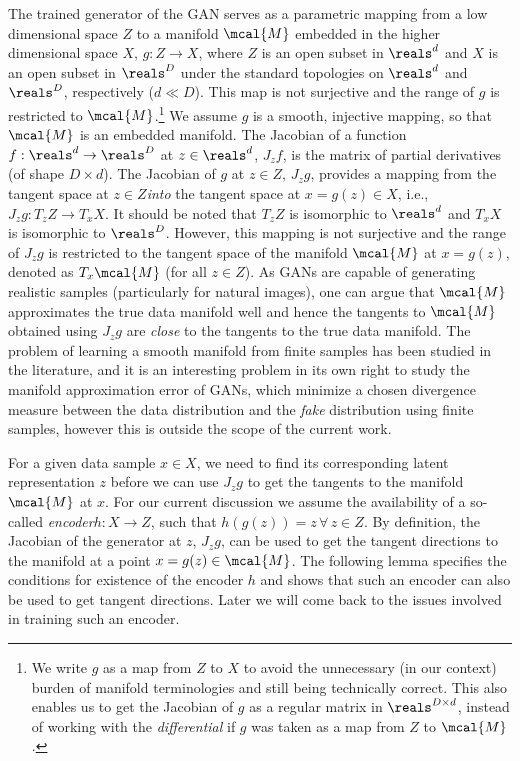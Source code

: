 \documentclass{article}
\begin{document}
The trained generator of the GAN serves as a parametric mapping from a low dimensional space $Z$ to a manifold $\mcal{M}$ embedded in the higher dimensional space $X$, $g: Z\to X$, where $Z$ is an open subset in $\reals^d$ and $X$ is an open subset in $\reals^D$ under the standard topologies on $\reals^d$ and $\reals^D$, respectively ($d\ll D$). This map is not surjective and the range of $g$ is restricted to $\mcal{M}$.\footnote{We write $g$ as a map from $Z$ to $X$ to avoid the unnecessary (in our context) burden of manifold terminologies and still being technically correct. This also enables us to get the Jacobian of $g$ as a regular matrix in $\reals^{D\times d}$, instead of working with the \emph{differential} if $g$ was taken as a map from $Z$ to $\mcal{M}$.} We assume $g$ is a smooth, injective mapping,
so that $\mcal{M}$ is an embedded manifold. The Jacobian of a function $f:\reals^d\to \reals^D$ at $z\in\reals^d$, $J_z f$, is the matrix of partial derivatives (of shape $D\times d$).
The Jacobian of $g$ at $z\in Z$, $J_zg$, provides a mapping from the tangent space at $z\in Z$\emph{into} the tangent space at $x=g(z)\in X$, i.e., $J_z g: T_z Z\to T_x X$. It should be noted that $T_zZ$ is isomorphic to $\reals^d$ and $T_xX$ is isomorphic to $\reals^D$. However, this mapping is not surjective and the range of $J_z g$ is restricted to the tangent space of the manifold $\mcal{M}$ at $x=g(z)$, denoted as $T_x\mcal{M}$ (for all $z\in Z$). As GANs are capable of generating realistic samples (particularly for natural images), one can argue that $\mcal{M}$ approximates the true data manifold well and hence the tangents to $\mcal{M}$ obtained using $J_z g$ are \emph{close} to the tangents to the true data manifold. The problem of learning a smooth manifold from finite samples has been studied in the literature\cite{canas2012learning,bernstein2012tangent, niyogi2011topological, chen2011some, vidal2005generalized, lerman2010probabilistic, jia2015laplacian, bernstein2014data}, and it is an interesting problem in its own right to study the manifold approximation error of GANs, which minimize a chosen divergence measure between the data distribution and the \emph{fake} distribution \cite{nowozin2016f,mohamed2016learning} using finite samples, however this is outside the scope of the current work.

For a given data sample $x\in X$, we need to find its corresponding latent representation $z$ before we can use $J_z g$ to get the tangents to the  manifold $\mcal{M}$ at $x$. For our current discussion we assume the availability of a so-called \emph{encoder}$h:X\to Z$, such that $h(g(z))=z\,\forall\,z\in Z$.
By definition, the Jacobian of the generator at $z$, $J_z g$, can be used to get the tangent directions to the manifold at a point $x=g(z)\in \mcal{M}$. The following lemma specifies the conditions for existence of the encoder $h$ and shows that such an encoder can also be used to get tangent directions. Later we will come back to the issues involved in training such an encoder. 
\end{document}
